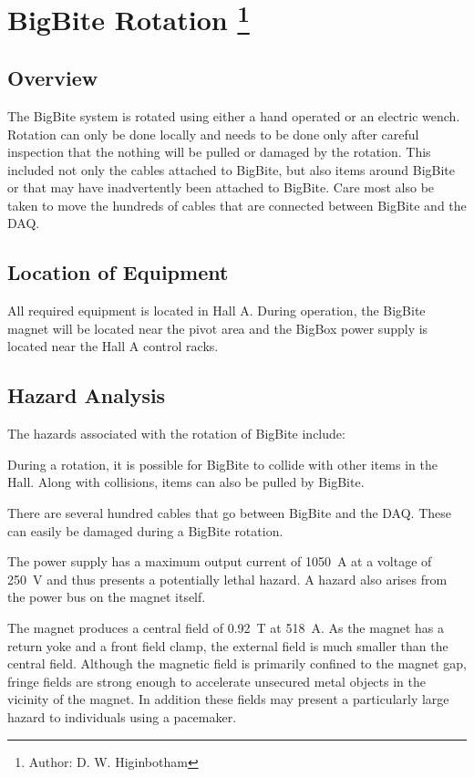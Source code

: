 %
%

\chapter[BigBite Magnet]{BigBite Rotation 
\footnote{Author: D. W. Higinbotham }
}

\section{Overview}
The BigBite system is rotated using either a hand operated or an electric wench.
Rotation can only be done locally and needs to be done only after careful inspection that
the nothing will be pulled or damaged by the rotation.  This included not only the cables
attached to BigBite, but also items around BigBite or that may have inadvertently been attached 
to BigBite.  Care most also be taken to move the hundreds of cables that are connected between BigBite
and the DAQ.

\section{Location of Equipment}

All required equipment is located in Hall A.  During operation, the BigBite magnet 
will be located near the pivot area and the BigBox power supply is
located near the Hall A control racks.

\section{Hazard Analysis}

The hazards associated with the rotation of BigBite include:

During a rotation, it is possible for BigBite to collide with other items in the Hall.
Along with collisions, items can also be pulled by BigBite.

There are several hundred cables that go between BigBite and the DAQ.  These can easily
be damaged during a BigBite rotation.

	The power supply has a maximum output current of 1050~A 
at a voltage of 250~V and thus presents a potentially lethal hazard.  
A hazard also arises from the power bus on the magnet itself. 

	The magnet produces a central field of 0.92~T at 518~A.  
As the magnet has a return yoke and a front field clamp, the external field is much smaller 
than the central field.   Although the magnetic field is primarily confined to the magnet 
gap, fringe fields are strong enough to accelerate unsecured metal objects in the vicinity of
the magnet.  In addition these fields may present a particularly large hazard 
to individuals using a pacemaker.

